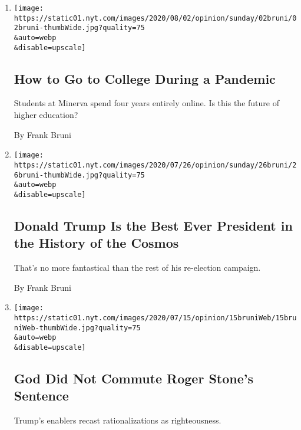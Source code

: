 \begin{enumerate}
\def\labelenumi{\arabic{enumi}.}
\item
  \href{/2020/08/01/opinion/sunday/minerva-college-coronavirus.html}{}

  \texttt{[image: https://static01.nyt.com/images/2020/08/02/opinion/sunday/02bruni/02bruni-thumbWide.jpg?quality=75\\\&auto=webp\\\&disable=upscale]}

  \hypertarget{how-to-go-to-college-during-a-pandemic}{%
  \subsection{How to Go to College During a
  Pandemic}\label{how-to-go-to-college-during-a-pandemic}}

  Students at Minerva spend four years entirely online. Is this the
  future of higher education?

  By Frank Bruni
\item
  \href{/2020/07/25/opinion/sunday/trump-lies.html}{}

  \texttt{[image: https://static01.nyt.com/images/2020/07/26/opinion/sunday/26bruni/26bruni-thumbWide.jpg?quality=75\\\&auto=webp\\\&disable=upscale]}

  \hypertarget{donald-trump-is-the-best-ever-president-in-the-history-of-the-cosmos}{%
  \subsection{Donald Trump Is the Best Ever President in the History of
  the
  Cosmos}\label{donald-trump-is-the-best-ever-president-in-the-history-of-the-cosmos}}

  That's no more fantastical than the rest of his re-election campaign.

  By Frank Bruni
\item
  \href{/2020/07/15/opinion/roger-stone-trump-god.html}{}

  \texttt{[image: https://static01.nyt.com/images/2020/07/15/opinion/15bruniWeb/15bruniWeb-thumbWide.jpg?quality=75\\\&auto=webp\\\&disable=upscale]}

  \hypertarget{god-did-not-commute-roger-stones-sentence}{%
  \subsection{God Did Not Commute Roger Stone's
  Sentence}\label{god-did-not-commute-roger-stones-sentence}}

  Trump's enablers recast rationalizations as righteousness.


\end{enumerate}
